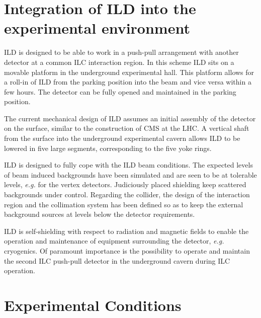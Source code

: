 \section{Integration of ILD into the experimental environment}
ILD is designed to be able to work in a push-pull arrangement with another detector at a common ILC interaction region. In this scheme ILD sits on a movable platform in the underground experimental hall. This platform allows for a roll-in of ILD from the parking position into the beam and vice versa within a few hours. The detector can be fully opened and maintained in the parking position.

The current mechanical design of ILD assumes an initial assembly of the detector on the surface, similar to the construction of CMS at the LHC. A vertical shaft from the surface into the underground experimental cavern allows ILD to be lowered in five large segments, corresponding to the five yoke rings.

ILD is designed to fully cope with the ILD beam conditions. The expected levels of beam induced backgrounds have been simulated and are seen to be at tolerable levels, {\it e.g.} for the vertex detectors. Judiciously placed shielding keep scattered backgrounds under control. Regarding the collider, the design of the interaction region and the collimation system has been defined so as to keep the external background sources at levels below the detector requirements.

ILD is self-shielding with respect to radiation and magnetic fields to enable the operation and maintenance of equipment surrounding the detector, {\it e.g.} cryogenics. Of paramount importance is the possibility to operate and maintain the second ILC push-pull detector in the underground cavern during ILC operation.

\section{Experimental Conditions}
 

